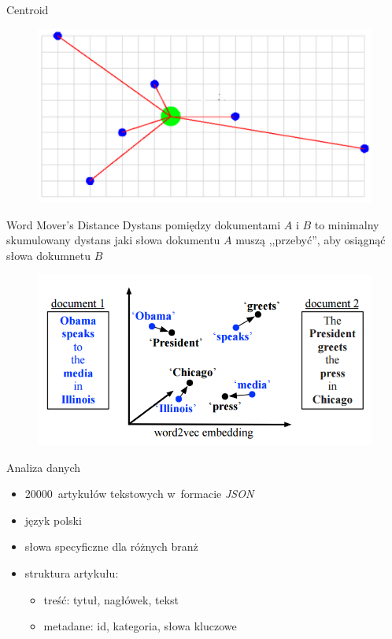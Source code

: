\documentclass{beamer}
\begin{document}
	\begin{frame}{Centroid}
		\begin{figure}
			\centering
			\includegraphics[width=1\textwidth]{img/centroid.png}
		\end{figure}
	\end{frame}
	\begin{frame}{Word Mover's Distance}
		Dystans pomiędzy dokumentami $A$ i $B$ to minimalny skumulowany dystans jaki słowa dokumentu $A$ muszą ,,przebyć'', aby osiągnąć słowa dokumnetu $B$
		\begin{figure}
			\centering
			\includegraphics[width=1\textwidth]{img/wmd.png}
		\end{figure}
	\end{frame}
	\begin{frame}{Analiza danych}
		\begin{itemize}
			\item 20000~artykułów tekstowych w~formacie \textit{JSON}
			\item język polski
			\item słowa specyficzne dla różnych branż
			\item struktura artykułu:
			\begin{itemize}
				\item treść: tytuł, nagłówek, tekst
				\item metadane: id, kategoria, słowa kluczowe
			\end{itemize}
		\end{itemize}
	\end{frame}
\end{document}

